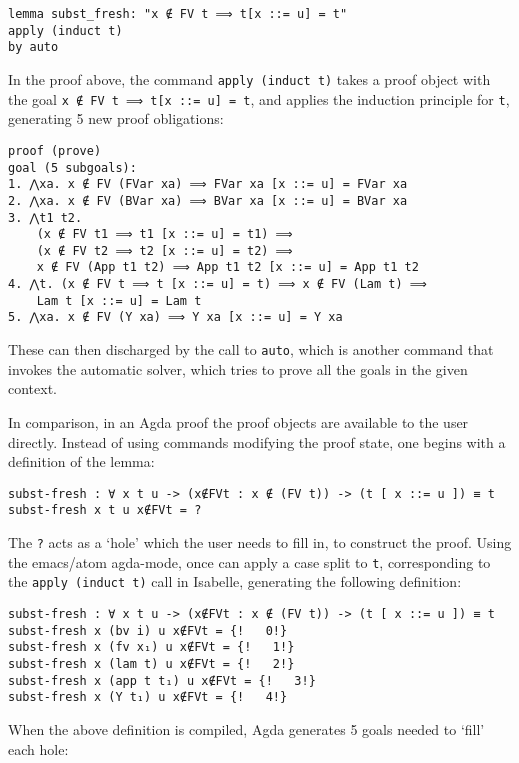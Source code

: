 \documentclass[a4paper, 12pt, twoside]{style/ociamthesis}
\theoremstyle{plain}
\theoremstyle{definition}
\theoremstyle{remark}
\begin{document}
\begin{verbatim}
lemma subst_fresh: "x ∉ FV t ⟹ t[x ::= u] = t"
apply (induct t)
by auto
\end{verbatim}

In the proof above, the command \texttt{apply (induct t)} takes a proof
object with the goal \texttt{x ∉ FV t ⟹ t[x ::= u] = t}, and applies the
induction principle for \texttt{t}, generating 5 new proof obligations:

\begin{verbatim}
proof (prove)
goal (5 subgoals):
1. ⋀xa. x ∉ FV (FVar xa) ⟹ FVar xa [x ::= u] = FVar xa
2. ⋀xa. x ∉ FV (BVar xa) ⟹ BVar xa [x ::= u] = BVar xa
3. ⋀t1 t2.
    (x ∉ FV t1 ⟹ t1 [x ::= u] = t1) ⟹
    (x ∉ FV t2 ⟹ t2 [x ::= u] = t2) ⟹
    x ∉ FV (App t1 t2) ⟹ App t1 t2 [x ::= u] = App t1 t2
4. ⋀t. (x ∉ FV t ⟹ t [x ::= u] = t) ⟹ x ∉ FV (Lam t) ⟹ 
    Lam t [x ::= u] = Lam t
5. ⋀xa. x ∉ FV (Y xa) ⟹ Y xa [x ::= u] = Y xa
\end{verbatim}

These can then discharged by the call to \texttt{auto}, which is another
command that invokes the automatic solver, which tries to prove all the
goals in the given context.

In comparison, in an Agda proof the proof objects are available to the
user directly. Instead of using commands modifying the proof state, one
begins with a definition of the lemma:

\begin{verbatim}
subst-fresh : ∀ x t u -> (x∉FVt : x ∉ (FV t)) -> (t [ x ::= u ]) ≡ t
subst-fresh x t u x∉FVt = ?
\end{verbatim}

The \texttt{?} acts as a `hole' which the user needs to fill in, to
construct the proof. Using the emacs/atom agda-mode, once can apply a
case split to \texttt{t}, corresponding to the \texttt{apply (induct t)}
call in Isabelle, generating the following definition:

\begin{verbatim}
subst-fresh : ∀ x t u -> (x∉FVt : x ∉ (FV t)) -> (t [ x ::= u ]) ≡ t
subst-fresh x (bv i) u x∉FVt = {!   0!}
subst-fresh x (fv x₁) u x∉FVt = {!   1!}
subst-fresh x (lam t) u x∉FVt = {!   2!}
subst-fresh x (app t t₁) u x∉FVt = {!   3!}
subst-fresh x (Y t₁) u x∉FVt = {!   4!}
\end{verbatim}

When the above definition is compiled, Agda generates 5 goals needed to
`fill' each hole:
\end{document}
